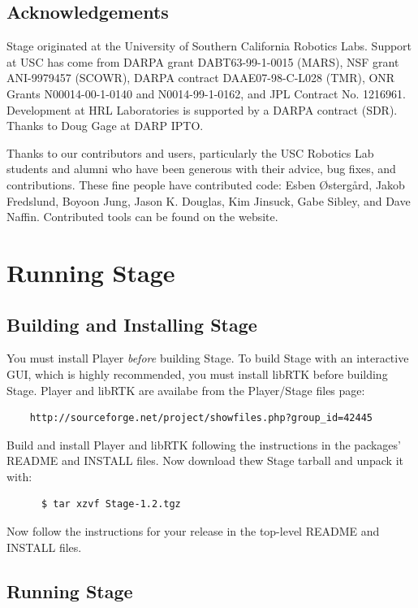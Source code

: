 \documentclass[11pt,twoside]{report}
\begin{document}
  \section{Acknowledgements}

Stage originated at the University of Southern California Robotics
    Labs. Support at USC has come from DARPA grant DABT63-99-1-0015
    (MARS), NSF grant ANI-9979457 (SCOWR), DARPA contract
    DAAE07-98-C-L028 (TMR), ONR Grants N00014-00-1-0140 and
    N0014-99-1-0162, and JPL Contract No. 1216961. Development at HRL
    Laboratories is supported by a DARPA contract (SDR). Thanks to
    Doug Gage at DARP IPTO.

Thanks to our contributors and users, particularly the USC Robotics
Lab students and alumni who have been generous with their advice, bug
fixes, and contributions. These fine people have contributed code:
Esben \O{}sterg\aa{}rd, Jakob Fredslund, Boyoon Jung, Jason
K. Douglas, Kim Jinsuck, Gabe Sibley, and Dave Naffin. Contributed
tools can be found on the website.

\chapter{Running Stage}
  \section{Building and Installing Stage}

  You must install Player {\em before} building Stage. To build Stage
 with an interactive GUI, which is highly recommended, you must
 install libRTK before building Stage. Player and libRTK are availabe
 from the Player/Stage files page:
	\begin{verbatim}
	http://sourceforge.net/project/showfiles.php?group_id=42445
	\end{verbatim}
	\noindent Build and install Player and libRTK following the
	instructions in the packages' README and INSTALL files. Now
	download thew Stage tarball and unpack it with:
      \begin{verbatim}
      $ tar xzvf Stage-1.2.tgz
      \end{verbatim}
   \noindent Now follow the instructions for your release in the
    top-level README and INSTALL files.

  \section{Running Stage}
\end{document}
